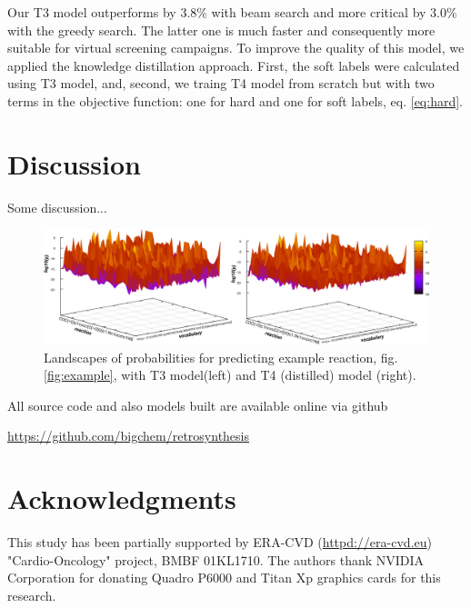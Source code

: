 \documentclass{article}
\begin{document}
Our T3 model outperforms \cite{Pande} by 3.8\% with beam search and more critical by 3.0\% with the greedy search. The latter one is much faster and consequently more suitable for virtual screening campaigns. To improve the quality of this model, we applied the knowledge distillation approach. First, the soft labels were calculated using T3 model, and, second, we traing T4 model from scratch but with two terms in the objective function: one for hard and one for soft labels, eq. \ref{eq:hard}. 


\section{Discussion}

Some discussion...

\begin{figure}
  \centering
  \includegraphics[width = 16.5cm]{images/probland.pdf}
  \caption{Landscapes of probabilities for predicting example reaction, fig. \ref{fig:example}, with  T3 model(left) and T4 (distilled) model (right). }
  \label{fig:landscape}
\end{figure}

All source code and also models built are available online via github
\begin{center}
  \url{https://github.com/bigchem/retrosynthesis}
\end{center}

\section*{Acknowledgments}
This study has been partially supported by ERA-CVD (\url{httpd://era-cvd.eu}) "Cardio-Oncology" project, BMBF 01KL1710.
The authors thank NVIDIA Corporation for donating Quadro P6000 and Titan Xp graphics cards for this research.

  

 
\end{document}
